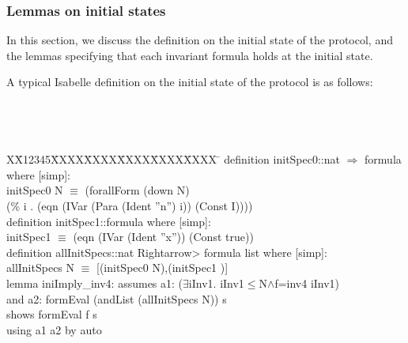 \documentclass[final]{IEEEtran}
\newlength{\fminilength}
\newenvironment{fmini}[1][\linewidth]
  {\setlength{\fminilength}{#1\fboxsep-2\fboxrule}%
   \vspace{2ex}\noindent\begin{lrbox}{\fminibox}\begin{minipage}{\fminilength}%
   \mbox{ }\hfill\vspace{-2.5ex}}%
  {\end{minipage}\end{lrbox}\vspace{1ex}\hspace{0ex}%
   \framebox{\usebox{\fminibox}}}
\newenvironment{specification}
{\noindent\scriptsize
\tt\begin{fmini}\begin{tabbing}X\=X12345\=XXXX\=XXXX\=XXXX\=XXXX\=XXXX
\=\+\kill} {\end{tabbing}\normalfont\end{fmini}}
\def \twoSpaces {\ \ }
\def \iInv {iInv}
\begin{document}
\subsubsection{Lemmas on initial states}

In this section, we discuss the definition on the initial state of the protocol, and the lemmas specifying that each invariant formula holds at the initial state.

A typical Isabelle definition on the initial state of the protocol is as follows:

\begin{specification}
definition initSpec0::nat $\Rightarrow$ formula where [simp]:\\
initSpec0 N $\equiv$ (forallForm (down N) \\
(\% i . (eqn (IVar (Para (Ident ''n'') i)) (Const I))))\\

definition initSpec1::formula where [simp]:\\
initSpec1  $\equiv$ (eqn (IVar (Ident ''x'')) (Const true))\\

definition allInitSpecs::nat \<Rightarrow> formula list where [simp]:\\
allInitSpecs N $\equiv$ [(initSpec0 N),(initSpec1 )]\\

lemma iniImply\_inv4:
assumes a1: ($\exists$\iInv1. \iInv1$\le$N$\wedge$f=inv4 \iInv1)\\
and a2: formEval (andList (allInitSpecs N)) s\\
shows formEval f s\\
 using a1 a2 by auto\\
\end{specification}
\end{document}
